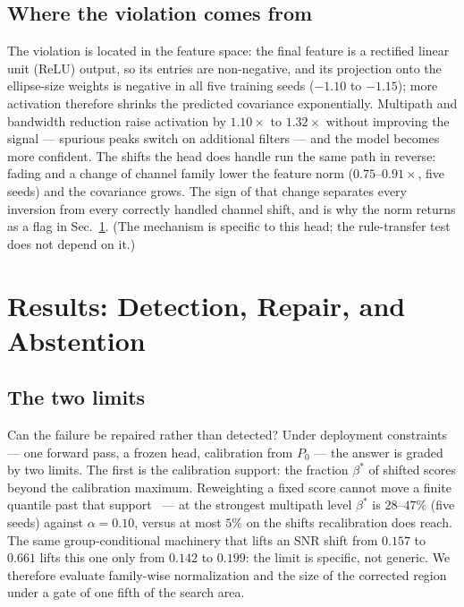 \documentclass{article}
\def\x{\times}
\begin{document}
\subsection{Where the violation comes from}
\label{sec:mech}
The violation is located in the feature space: the final feature is a rectified linear unit (ReLU)
output, so its entries are non-negative, and its projection onto the ellipse-size
weights is negative in all five training seeds ($-1.10$ to $-1.15$);
more activation therefore shrinks the predicted covariance exponentially.
Multipath and bandwidth reduction raise activation by $1.10\x$ to $1.32\x$
without improving the signal --- spurious peaks switch on additional
filters --- and the model becomes more confident. The shifts the head does
handle run the same path in reverse: fading and a change of channel family
lower the feature norm ($0.75$--$0.91\x$, five seeds) and the covariance
grows. The sign of that change separates every inversion from every
correctly handled channel shift, and is why the norm returns as a flag in
Sec.~\ref{sec:detect}. (The mechanism is specific to this head; the
rule-transfer test does not depend on it.)

\section{Results: Detection, Repair, and Abstention}
\label{sec:detect}

\subsection{The two limits}
Can the failure be repaired rather than detected? Under deployment
constraints --- one forward pass, a frozen head, calibration from $P_0$ ---
the answer is graded by two limits. The first is the calibration
support: the fraction $\beta^{*}$ of shifted scores beyond the calibration
maximum. Reweighting a fixed score cannot move a finite quantile past that
support~\cite{tibshirani2019} --- at the strongest multipath level
$\beta^{*}$ is $28$--$47\%$ (five seeds) against
$\alpha=0.10$, versus at most $5\%$ on the shifts recalibration does
reach. The same group-conditional machinery that lifts an SNR shift from
$0.157$ to $0.661$ lifts this one only from $0.142$ to $0.199$: the limit
is specific, not generic. We therefore evaluate family-wise normalization and the size of the
corrected region under a gate of one fifth of the search area.
\end{document}
